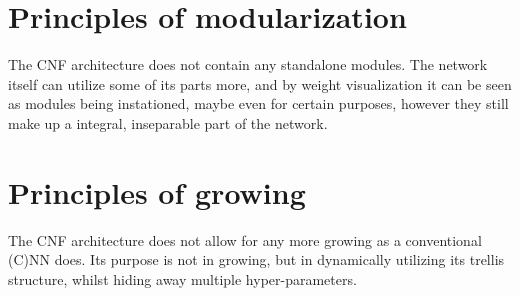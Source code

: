 \documentclass[a4paper,twocolumn]{article}
\begin{document}
\section{Principles of modularization}
The CNF architecture does not contain any standalone modules. The network itself can utilize some of its parts more, and by weight visualization it can be seen as modules being instationed, maybe even for certain purposes, however they still make up a integral, inseparable part of the network.

\section{Principles of growing}
The CNF architecture does not allow for any more growing as a conventional (C)NN does. Its purpose is not in growing, but in dynamically utilizing its trellis structure, whilst hiding away multiple hyper-parameters.
\end{document}
